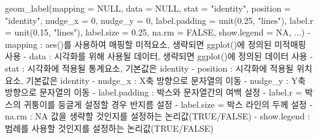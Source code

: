 \documentclass[
]{article}
\newenvironment{Shaded}{\begin{snugshade}}{\end{snugshade}}
\newcommand{\AttributeTok}[1]{\textcolor[rgb]{0.77,0.63,0.00}{#1}}
\newcommand{\ConstantTok}[1]{\textcolor[rgb]{0.00,0.00,0.00}{#1}}
\newcommand{\DecValTok}[1]{\textcolor[rgb]{0.00,0.00,0.81}{#1}}
\newcommand{\FloatTok}[1]{\textcolor[rgb]{0.00,0.00,0.81}{#1}}
\newcommand{\FunctionTok}[1]{\textcolor[rgb]{0.00,0.00,0.00}{#1}}
\newcommand{\NormalTok}[1]{#1}
\newcommand{\OtherTok}[1]{\textcolor[rgb]{0.56,0.35,0.01}{#1}}
\newcommand{\SpecialCharTok}[1]{\textcolor[rgb]{0.00,0.00,0.00}{#1}}
\newcommand{\StringTok}[1]{\textcolor[rgb]{0.31,0.60,0.02}{#1}}
\begin{document}
\begin{Shaded}
\begin{Highlighting}[]
\FunctionTok{geom\_label}\NormalTok{(}\AttributeTok{mapping =} \ConstantTok{NULL}\NormalTok{, }\AttributeTok{data =} \ConstantTok{NULL}\NormalTok{, }\AttributeTok{stat =} \StringTok{"identity"}\NormalTok{, }\AttributeTok{position =} \StringTok{"identity"}\NormalTok{, }\AttributeTok{nudge\_x =} \DecValTok{0}\NormalTok{, }\AttributeTok{nudge\_y =} \DecValTok{0}\NormalTok{, }\AttributeTok{label.padding =} \FunctionTok{unit}\NormalTok{(}\FloatTok{0.25}\NormalTok{, }\StringTok{"lines"}\NormalTok{), }\AttributeTok{label.r =} \FunctionTok{unit}\NormalTok{(}\FloatTok{0.15}\NormalTok{, }\StringTok{"lines"}\NormalTok{), }\AttributeTok{label.size =} \FloatTok{0.25}\NormalTok{, }\AttributeTok{na.rm =} \ConstantTok{FALSE}\NormalTok{, }\AttributeTok{show.legend =} \ConstantTok{NA}\NormalTok{, ...)}
  \SpecialCharTok{{-}}\NormalTok{ mapping }\SpecialCharTok{:} \FunctionTok{aes}\NormalTok{()를 사용하여 매핑할 미적요소, 생략되면 }\FunctionTok{ggplot}\NormalTok{()에 정의된 미적매핑 사용}
  \SpecialCharTok{{-}}\NormalTok{ data }\SpecialCharTok{:}\NormalTok{ 시각화를 위해 사용될 데이터, 생략되면 }\FunctionTok{ggplot}\NormalTok{()에 정의된 데이터 사용}
  \SpecialCharTok{{-}}\NormalTok{ stat }\SpecialCharTok{:}\NormalTok{ 시각화에 적용될 통계요소, 기본값은 }\StringTok{\textquotesingle{}identity\textquotesingle{}}
  \SpecialCharTok{{-}}\NormalTok{ position }\SpecialCharTok{:}\NormalTok{ 시각화에 적용될 위치요소, 기본값은 }\StringTok{\textquotesingle{}identity\textquotesingle{}}
  \SpecialCharTok{{-}}\NormalTok{ nudge\_x }\SpecialCharTok{:}\NormalTok{ X축 방향으로 문자열의 이동}
  \SpecialCharTok{{-}}\NormalTok{ nudge\_y }\SpecialCharTok{:}\NormalTok{  Y축 방향으로 문자열의 이동}
  \SpecialCharTok{{-}}\NormalTok{ label.padding }\SpecialCharTok{:}\NormalTok{ 박스와 문자열간의 여백 설정}
  \SpecialCharTok{{-}}\NormalTok{ label.r }\OtherTok{=}\NormalTok{ 박스의 귀퉁이를 둥글게 설정할 경우 반지름 설정}
  \SpecialCharTok{{-}}\NormalTok{ label.size }\OtherTok{=}\NormalTok{ 박스 라인의 두께 설정}
  \SpecialCharTok{{-}}\NormalTok{ na.rm }\SpecialCharTok{:} \ConstantTok{NA}\NormalTok{ 값을 생략할 것인지를 설정하는 논리값(}\ConstantTok{TRUE}\SpecialCharTok{/}\ConstantTok{FALSE}\NormalTok{)}
  \SpecialCharTok{{-}}\NormalTok{ show.legend }\SpecialCharTok{:}\NormalTok{ 범례를 사용할 것인지를 설정하는 논리값(}\ConstantTok{TRUE}\SpecialCharTok{/}\ConstantTok{FALSE}\NormalTok{) }
\end{Highlighting}
\end{Shaded}
\end{document}
